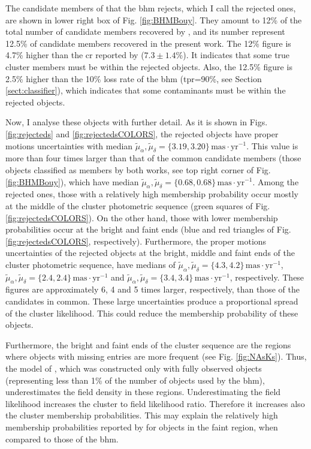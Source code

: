 The candidate members of \citet{Bouy2015} that the \gls{bhm} rejects, which I call the rejected ones, are shown in lower right box of Fig. \ref{fig:BHMBouy}. They amount to 12\% of the total number of candidate members recovered by \citet{Bouy2015}, and its number represent 12.5\% of  candidate members recovered in the present work. The 12\% figure is 4.7\% higher than the \gls{cr} reported by \citet{Sarro2014} ($7.3\pm1.4$\%). It indicates that some true cluster members must be within the rejected objects. Also, the 12.5\% figure is 2.5\% higher than the 10\% loss rate of the \gls{bhm} (\gls{tpr}=90\%, see Section \ref{sect:classifier}), which indicates that some contaminants must be within the rejected objects.

Now, I analyse these objects with further detail. As it is shown in Figs. \ref{fig:rejecteds} and \ref{fig:rejectedsCOLORS}, the rejected objects have proper motions uncertainties with median $\tilde{\mu}_{\alpha},\tilde{\mu}_{\delta}=\{3.19,3.20\} \,\mathrm{mas\cdot yr^{-1}}$. This value is more than four times larger than that of the common candidate members (those objects classified as members by both works, see top right corner of Fig. \ref{fig:BHMBouy}), which have median $\tilde{\mu}_{\alpha},\tilde{\mu}_{\delta}=\{0.68,0.68\} \,\mathrm{mas\cdot yr^{-1}}$. Among the rejected ones, those with a relatively high membership probability occur mostly at the middle of the cluster photometric sequence (green squares of Fig. \ref{fig:rejectedsCOLORS}). On the other hand, those with lower membership probabilities occur at the bright and faint ends (blue and red triangles of Fig. \ref{fig:rejectedsCOLORS}, respectively). Furthermore, the proper motions uncertainties of the rejected objects at the bright, middle and faint ends of the cluster photometric sequence, have medians of $\tilde{\mu}_{\alpha},\tilde{\mu}_{\delta}=\{4.3,4.2\}  \,\mathrm{mas\cdot yr^{-1}}$, $\tilde{\mu}_{\alpha},\tilde{\mu}_{\delta}=\{2.4,2.4\}\,\mathrm{mas\cdot yr^{-1}}$ and $\tilde{\mu}_{\alpha},\tilde{\mu}_{\delta}=\{3.4,3.4\}\,\mathrm{mas\cdot yr^{-1}}$, respectively. These figures are approximately 6, 4 and 5 times larger, respectively, than those of the candidates in common. These large uncertainties produce a proportional spread of the cluster likelihood. This could reduce the membership probability of these objects.

Furthermore, the bright and faint ends of the cluster sequence are the regions where objects with missing entries are more frequent (see Fig. \ref{fig:NAsKs}). Thus, the model of \citet{Bouy2015}, which was constructed only with fully observed objects (representing less than 1\% of the number of objects used by the \gls{bhm}), underestimates the field density in these regions. Underestimating the field likelihood increases the cluster to field likelihood ratio. Therefore it increases also the cluster membership probabilities. This may explain the relatively high membership probabilities reported by \citet{Bouy2015} for objects in the faint region, when compared to those of the \gls{bhm}.

